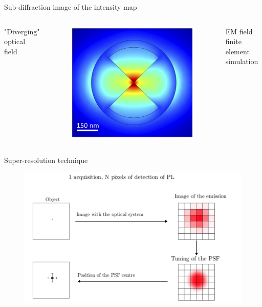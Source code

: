 \documentclass[xcolor = {dvipsnames}]{beamer}
\begin{document}
\begin{frame}{Sub-diffraction image of the intensity map}
\begin{columns}
\centering "Diverging" optical field
\begin{figure}[h!]
\centering
\includegraphics[width=1\textwidth]{images/intensity}
\end{figure}
\centering
EM field finite element simulation
\end{columns}
\end{frame}

\begin{frame}{Super-resolution technique}
	\begin{figure}[h!]
	\centering
	\includegraphics[width=.9\textwidth]{images/SR}
	\end{figure}
\end{frame}
\end{document}

